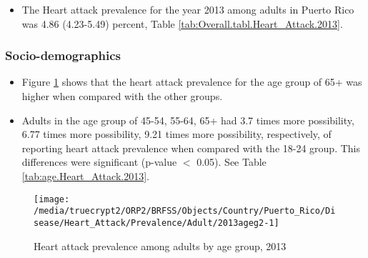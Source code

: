 \begin{itemize}


\item The Heart attack prevalence for the year 2013 among adults in Puerto Rico was 4.86 (4.23-5.49) percent, 
Table \ref{tab:Overall.tabl.Heart_Attack.2013}.

\end{itemize}



\newpage
\subsubsection{Socio-demographics}

\begin{itemize}

\item Figure \ref{fig:age.Heart_Attack.2013} shows that the heart attack prevalence for the age group of
65+
was higher when compared with the other groups.

\item Adults in the age group of 45-54, 55-64, 65+ had 3.7 times more possibility, 6.77 times more possibility, 9.21 times more possibility, respectively, of reporting heart attack prevalence when compared with the 18-24 group. This differences were significant (p-value $<$ 0.05). See Table \ref{tab:age.Heart_Attack.2013}.


\end{itemize}


\begin{figure}[H]
\caption{Heart attack prevalence among adults by age group, 
2013}
\begin{knitrout}
\color{fgcolor}

{\centering \texttt{[image: /media/truecrypt2/ORP2/BRFSS/Objects/Country/Puerto\_Rico/Disease/Heart\_Attack/Prevalence/Adult/2013ageg2-1]} 

}



\end{knitrout}
\label{fig:age.Heart_Attack.2013}
\end{figure}

